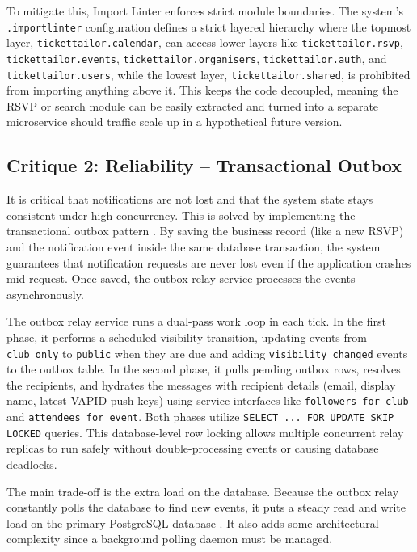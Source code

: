 To mitigate this, Import Linter enforces strict module boundaries. The system's \texttt{.importlinter} configuration defines a strict layered hierarchy where the topmost layer, \texttt{tickettailor.calendar}, can access lower layers like \texttt{tickettailor.rsvp}, \texttt{tickettailor.events}, \texttt{tickettailor.organisers}, \texttt{tickettailor.auth}, and \texttt{tickettailor.users}, while the lowest layer, \texttt{tickettailor.shared}, is prohibited from importing anything above it. This keeps the code decoupled, meaning the RSVP or search module can be easily extracted and turned into a separate microservice should traffic scale up in a hypothetical future version.

\subsection{Critique 2: Reliability -- Transactional Outbox}
It is critical that notifications are not lost and that the system state stays consistent under high concurrency. This is solved by implementing the transactional outbox pattern \cite{richardson_microservices_2025}. By saving the business record (like a new RSVP) and the notification event inside the same database transaction, the system guarantees that notification requests are never lost even if the application crashes mid-request. Once saved, the outbox relay service processes the events asynchronously. 

The outbox relay service runs a dual-pass work loop in each tick. In the first phase, it performs a scheduled visibility transition, updating events from \texttt{club\_only} to \texttt{public} when they are due and adding \texttt{visibility\_changed} events to the outbox table. In the second phase, it pulls pending outbox rows, resolves the recipients, and hydrates the messages with recipient details (email, display name, latest VAPID push keys) using service interfaces like \texttt{followers\_for\_club} and \texttt{attendees\_for\_event}. Both phases utilize \texttt{SELECT ... FOR UPDATE SKIP LOCKED} queries. This database-level row locking allows multiple concurrent relay replicas to run safely without double-processing events or causing database deadlocks.

The main trade-off is the extra load on the database. Because the outbox relay constantly polls the database to find new events, it puts a steady read and write load on the primary PostgreSQL database \cite{richardson_microservices_2025}. It also adds some architectural complexity since a background polling daemon must be managed.

